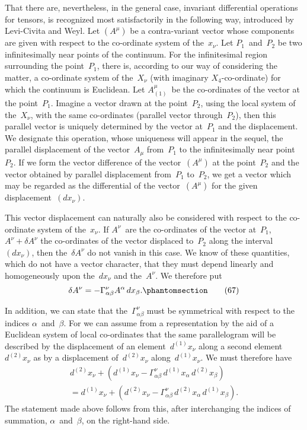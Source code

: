 \documentclass[12pt]{book}[2005/09/16]
\newcommand{\Change}[2]{#2}
\newcommand{\Add}[1]{\Change{}{#1}}
\newcommand{\PageSep}[1]{\ignorespaces}
\newcommand{\Tag}[1]{%
  \phantomsection
  \label{eqn:#1}
  \tag*{#1}
}
\begin{document}
That there are, nevertheless, in the general case, invariant
differential operations for tensors, is recognized
most satisfactorily in the following way, introduced by
Levi-Civita and Weyl. Let $(A^{\mu})$ be a contra-variant vector
%
%
whose components are given with respect to the co-ordinate
system of the~$x_{\nu}$. Let $P_{1}$~and~$P_{2}$ be two infinitesimally
near points of the continuum. For the
infinitesimal region surrounding the point~$P_{1}$, there is,
according to our way of considering the matter, a co-ordinate
system of the~$X_{\nu}$ (with imaginary $X_{\Change{\nu}{4}}$-\Change{co-ordinates}{co-ordinate})
for which the continuum is Euclidean. Let
$A_{(1)}^{\mu}$~be the co-ordinates of the vector at the point~$P_{1}$.
Imagine a vector drawn at the point~$P_{2}$, using the local
system of the~$X_{\nu}$, with the same co-ordinates (parallel
vector through~$P_{2}$), then this parallel vector is uniquely
determined by the vector at~$P_{1}$ and the displacement.
We designate this operation, whose uniqueness will appear
in the sequel, the parallel displacement of the vector~$A_{\mu}$
from~$P_{1}$ to the infinitesimally near point~$P_{2}$\Change{}{.} If we form
the vector difference of the vector~$(A^{\mu})$ at the point~$P_{2}$
and the vector obtained by parallel displacement from~$P_{1}$
to~$P_{2}$, we get a vector which may be regarded as the
differential of the vector~$(A^{\mu})$ for the given displacement~$(dx_{\nu})$.

This vector displacement can naturally also be considered
with respect to the co-ordinate system of the~$x_{\nu}$.
If $A^{\nu}$~are the co-ordinates of the vector at~$P_{1}$, $A^{\nu} + \delta A^{\nu}$
the co-ordinates of the vector displaced to~$P_{2}$ along the
interval~$(dx_{\nu})$, then the~$\delta A^{\nu}$ do not vanish in this case.
We know of these quantities, which do not have a vector
\PageSep{78}
character, that they must depend linearly and homogeneously
upon the~$dx_{\nu}$ and the~$A^{\nu}$. We therefore put
\[
\delta A^{\nu} = -\Gamma_{\alpha\beta}^{\nu} A^{\alpha}\, dx_{\beta}\Add{.}
\Tag{(67)}
\]

In addition, we can state that the~$\Gamma_{\alpha\beta}^{\nu}$ must be symmetrical
with respect to the indices $\alpha$~and~$\beta$. For we
can assume from a representation by the aid of a Euclidean
system of local co-ordinates that the same parallelogram
will be described by the displacement of an element~$d^{(1)}x_{\nu}$
along a second element~$d^{(2)}x_{\nu}$ as by a displacement
of~$d^{(2)}x_{\nu}$ along~$d^{(1)}x_{\nu}$. We must therefore have
\begin{multline*}
d^{(2)}x_{\nu} + (d^{(1)}x_{\nu}
  - \Gamma_{\alpha\beta}^{\nu}\, d^{(1)}x_{\alpha}\, d^{(2)}x_{\beta}) \\
  = d^{(1)}x_{\nu} + (d^{(2)}x_{\nu}
  - \Gamma_{\alpha\beta}^{\nu}\, d^{(2)}x_{\alpha}\, d^{(1)}x_{\beta}).
\end{multline*}
The statement made above follows from this, after interchanging
the indices of summation, $\alpha$~and~$\beta$, on the
right-hand side.
\end{document}
